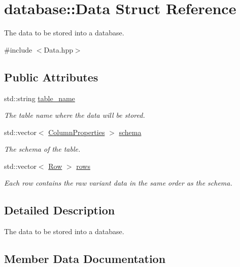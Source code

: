 \hypertarget{structdatabase_1_1_data}{}\section{database\+:\+:Data Struct Reference}
\label{structdatabase_1_1_data}


The data to be stored into a database.  




{\ttfamily \#include $<$Data.\+hpp$>$}

\subsection*{Public Attributes}
\begin{DoxyCompactItemize}
\item 
std\+::string \hyperlink{structdatabase_1_1_data_a1a24b475b6698376a166ff80ef0a8fe8}{table\+\_\+name}
\begin{DoxyCompactList}\small\item\em The table name where the data will be stored. \end{DoxyCompactList}\item 
std\+::vector$<$ \hyperlink{structdatabase_1_1_column_properties}{Column\+Properties} $>$ \hyperlink{structdatabase_1_1_data_ae674b19f66a2cdfafa134304121ebbe2}{schema}
\begin{DoxyCompactList}\small\item\em The schema of the table. \end{DoxyCompactList}\item 
std\+::vector$<$ \hyperlink{structdatabase_1_1_row}{Row} $>$ \hyperlink{structdatabase_1_1_data_ae45d84ed5b3ce80a7683df0c3f40d518}{rows}
\begin{DoxyCompactList}\small\item\em Each row contains the raw variant data in the same order as the schema. \end{DoxyCompactList}\end{DoxyCompactItemize}


\subsection{Detailed Description}
The data to be stored into a database. 

\subsection{Member Data Documentation}
